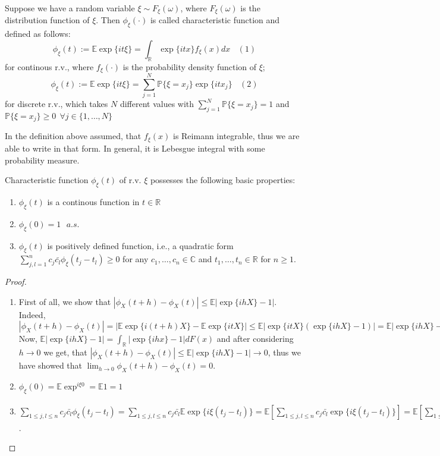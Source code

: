 \begin{definition}
Suppose we have a random variable $\xi \sim F_{\xi}(\omega)$, where $F_{\xi}(\omega)$ is the distribution function of $\xi$. Then $\phi_{\xi}(\cdot)$ is called characteristic function and defined as follows:
$$\phi_{\xi}(t) := \mathbb{E}\exp\{it\xi\} = \int_{\mathbb{R}} \exp\{itx\}f_{\xi}(x)dx \: \: \: \: (1)$$
for continous r.v., where $f_{\xi}(\cdot)$ is the probability density function of $\xi$;  
$$\phi_{\xi}(t) := \mathbb{E}\exp\{it\xi\} = \sum_{j=1}^{N} \mathbb{P}\{\xi=x_j\} \exp\{itx_j\} \: \: \: \: (2)$$
for discrete r.v., which takes $N$ different values with $\sum_{j=1}^{N} \mathbb{P}\{\xi=x_j\} =1$ and $\mathbb{P}\{\xi=x_j\} \ge 0 \: \: \forall j \in \{1, \dots, N\}$
\end{definition}
\begin{rmrk}
In the definition above assumed, that $f_{\xi}(x)$ is Reimann integrable, thus we are able to write in that form. In general, it is Lebesgue integral with some probability measure.
\end{rmrk}
\begin{theorem}
Characteristic function $\phi_{\xi}(t)$ of r.v. $\xi$ possesses the following basic properties:
\begin{enumerate}
\item $\phi_{\xi}(t)$ is a continous function in $t \in \mathbb{R}$
\item $\phi_{\xi}(0) = 1 \: \: \: a.s.$ 
\item $\phi_{\xi}(t)$ is positively defined function, i.e., a quadratic form $\sum_{j,l=1}^{n} c_j \bar{c_l}\phi_{\xi}(t_j-t_l) \ge 0$ for any $c_1, \dots, c_n \in \mathbb{C}$ and $t_1, \dots, t_n \in \mathbb{R}$ for $n \ge 1.$
\end{enumerate}
\end{theorem}
\begin{proof}
\begin{enumerate}
\item First of all, we show that $|\phi_X(t+h)-\phi_X(t)| \le \mathbb{E}|\exp\{ihX\}-1|$. \\
Indeed, $|\phi_X(t+h)-\phi_X(t)| = |\mathbb{E}\exp\{i(t+h)X\}-\mathbb{E}\exp\{itX\}| \le \mathbb{E}|\exp\{itX\}(\exp\{ihX\}-1)| = \mathbb{E}|\exp\{ihX\}-1|.$ \\
Now, $\mathbb{E}|\exp\{ihX\}-1| = \int_{\mathbb{R}} |\exp\{ihx\}-1| dF(x)$ and after considering $h \to 0$ we get, that $|\phi_X(t+h)-\phi_X(t)| \le \mathbb{E}|\exp\{ihX\}-1| \to 0$, thus we have showed that $\lim_{h \to 0} \phi_X(t+h)-\phi_X(t) = 0$.
\item $\phi_{\xi}(0) = \mathbb{E}\exp^{i\xi0} = \mathbb{E} 1 = 1$
\item $\sum_{1 \le j,l \le n} c_j \bar{c_l}\phi_{\xi}(t_j-t_l) = \sum_{1 \le j,l \le n} c_j \bar{c_l} \mathbb{E} \exp\{i\xi(t_j-t_l)\} = \mathbb{E}[ \sum_{1 \le j,l \le n} c_j \bar{c_l} \exp\{i\xi(t_j-t_l)\} ]= \mathbb{E}[ \sum_{1 \le j \le n} c_j \exp\{i\xi t_j\} \sum_{1 \le j \le n}  \bar{c_j \exp\{i\xi t_j\}}] = \mathbb{E}[ |\sum_{1 \le j \le n} c_j \exp\{i\xi t_j\}|^2] \ge 0 $.
\end{enumerate}
\end{proof}
